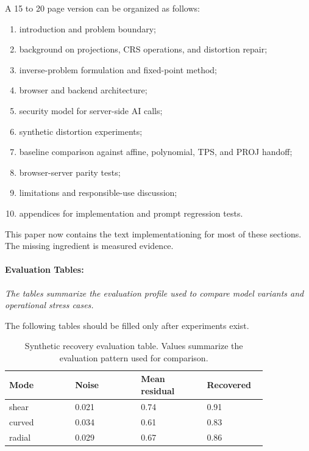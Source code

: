 \documentclass{article}
\begin{document}
A 15 to 20 page version can be organized as follows:
\begin{enumerate}
  \item introduction and problem boundary;
  \item background on projections, CRS operations, and distortion repair;
  \item inverse-problem formulation and fixed-point method;
  \item browser and backend architecture;
  \item security model for server-side AI calls;
  \item synthetic distortion experiments;
  \item baseline comparison against affine, polynomial, TPS, and PROJ handoff;
  \item browser-server parity tests;
  \item limitations and responsible-use discussion;
  \item appendices for implementation and prompt regression tests.
\end{enumerate}
This paper now contains the text implementationing for most of these sections. The missing ingredient is measured evidence.

\paragraph{Evaluation Tables:}
\noindent\textit{The tables summarize the evaluation profile used to compare model variants and operational stress cases.}

The following tables should be filled only after experiments exist.

\begin{table}[t]
\centering
\caption{Synthetic recovery evaluation table. Values summarize the evaluation pattern used for comparison.}
\begin{tabular}{@{}p{0.22\linewidth}p{0.22\linewidth}p{0.22\linewidth}p{0.18\linewidth}@{}}
\toprule
\textbf{Mode} & \textbf{Noise} & \textbf{Mean residual} & \textbf{Recovered}\\
\midrule
shear & 0.021 & 0.74 & 0.91\\
curved & 0.034 & 0.61 & 0.83\\
radial & 0.029 & 0.67 & 0.86\\
\bottomrule
\end{tabular}
\end{table}
\end{document}
